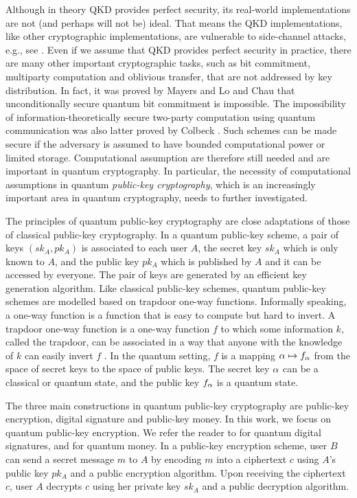 \documentclass[11pt]{article}
\theoremstyle{plain}
\theoremstyle{definition}
\let\ket\relax
\DeclarePairedDelimiter{\ket}{\lvert}{\rangle}
\begin{document}
Although in theory QKD provides perfect security, its real-world implementations are not (and perhaps will not be) ideal. That means the QKD implementations, like other cryptographic implementations, are vulnerable to side-channel attacks, e.g., see \cite{lydersen2010hacking}. Even if we assume that QKD provides perfect security in practice, there are many other important cryptographic tasks, such as bit commitment, multiparty computation and oblivious transfer, that are not addressed by key distribution. In fact, it was proved by Mayers \cite{mayers1997unconditionally} and Lo and Chau \cite{lo1997quantum} that unconditionally secure quantum bit commitment is impossible. The impossibility of information-theoretically secure two-party computation using quantum communication was also latter proved by Colbeck \cite{colbeck2007impossibility}. Such schemes can be made secure if the adversary is assumed to have bounded computational power or limited storage. Computational assumption are therefore still needed and are important in quantum cryptography. In particular, the necessity of computational assumptions in quantum \textit{public-key cryptography}, which is an increasingly important area in quantum cryptography, needs to further investigated.

The principles of quantum public-key cryptography are close adaptations of those of classical public-key cryptography. In a quantum public-key scheme, a pair of keys $(sk_A, pk_A)$ is associated to each user $A$, the secret key $sk_A$ which is only known to $A$, and the public key $pk_A$ which is published by $A$ and it can be accessed by everyone. The pair of keys are generated by an efficient key generation algorithm. Like classical public-key schemes, quantum public-key schemes are modelled based on trapdoor one-way functions. Informally speaking, a one-way function is a function that is easy to compute but hard to invert. A trapdoor one-way function is a one-way function $f$ to which some information $k$, called the trapdoor, can be associated in a way that anyone with the knowledge of $k$ can easily invert $f$ \cite{boneh2015graduate}. In the quantum setting, $f$ is a mapping $\ket{\alpha} \mapsto \ket{f_\alpha}$ from the space of secret keys to the space of public keys. The secret key $\ket{\alpha}$ can be a classical or quantum state, and the public key $\ket{f_\alpha}$ is a quantum state. 

The three main constructions in quantum public-key cryptography are public-key encryption, digital signature and public-key money. In this work, we focus on quantum public-key encryption. We refer the reader to \cite{gottesman2001quantum} for quantum digital signatures, and \cite{aaronson2009quantum, aaronson2012quantum, farhi2012quantum} for quantum money. In a public-key encryption scheme, user $B$ can send a secret message $m$ to $A$ by encoding $m$ into a ciphertext $c$ using $A$'s public key $pk_A$ and a public encryption algorithm. Upon receiving the ciphertext $c$, user $A$ decrypts $c$ using her private key $sk_A$ and a public decryption algorithm. 
\end{document}
